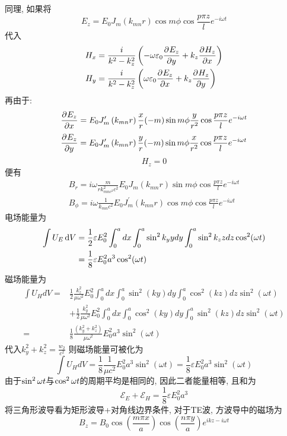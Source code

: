 \documentclass[UTF8,9pt]{ctexart}
\begin{document}
同理, 如果将$$ 
E_z=E_{0} J_{m}\left(k_{m n} r\right) \cos m \phi \cos \frac{p \pi z}{l} e^{-i \omega t}
 $$
代入
$$\begin{aligned} 
    H_x &= \frac{i}{k^2-k_z^2}\left( -\omega \varepsilon_0\frac{\partial^{} E_z}{\partial {y}^{}}+k_z\frac{\partial^{} H_z}{\partial {x}^{}} \right)\\
    H_y &= \frac{i}{k^2-k_z^2}\left( \omega \varepsilon_0\frac{\partial^{} E_z}{\partial {x}^{}}+k_z\frac{\partial^{} H_z}{\partial {y}^{}} \right)
 \end{aligned}$$
再由于:
$$\frac{\partial^{} E_z}{\partial {x}^{}} = E_{0} J'_{m}\left(k_{m n} r\right)\frac{x}{r}(-m) \sin m \phi\frac{y}{r^2} \cos \frac{p \pi z}{l} e^{-i \omega t}$$
$$\frac{\partial^{} E_z}{\partial {y}^{}} = E_{0} J'_{m}\left(k_{m n} r\right)\frac{y}{r}(-m) \sin m \phi\frac{x}{r^2} \cos \frac{p \pi z}{l} e^{-i \omega t}$$
$$H_z=0$$
便有
$$ \boxed{
\begin{array}{l}{B_{r}=i \omega \frac{m}{r k_{m n c^{2}}^{2} c^{2}} E_{0} J_{m}\left(k_{m n} r\right) \sin m \phi \cos \frac{p \pi z}{l} e^{-i \omega t}} \\ {B_{\phi}=i \omega \frac{1}{k_{m n} c^{2}} E_{0} J_{m}^{\prime}\left(k_{m n} r\right) \cos m \phi \cos \frac{p \pi z}{l} e^{-i \omega t}}\end{array}
 }$$
电场能量为
$$ 
\begin{aligned} \int U_{E} \mathop{}\!\mathrm{d} V &=\frac{1}{2} \varepsilon E_{0}^{2} \int_{0}^{a} d x \int_{0}^{a} \sin ^{2} k_{y} y d y \int_{0}^{a} \sin ^{2} k_{z} z d z \cos ^{2}(\omega t) \\ &=\frac{1}{8} \varepsilon E_{0}^{2} a^{3} \cos ^{2}(\omega t) \end{aligned}
 $$
 磁场能量为
 $$ 
\begin{aligned} \int U_{H} d V=& \frac{1}{2} \frac{k_{z}^{2}}{\mu \omega^{2}} E_{0}^{2} \int_{0}^{a} d x \int_{0}^{a} \sin ^{2}(k y) d y \int_{0}^{a} \cos ^{2}(k z) d z \sin ^{2}(\omega t) \\ &+\frac{1}{2} \frac{k_{y}^{2}}{\mu \omega^{2}} E_{0}^{2} \int_{0}^{a} d x \int_{0}^{a} \cos ^{2}(k y) d y \int_{0}^{a} \sin ^{2}(k z) d z \sin ^{2}(\omega t) \\=& \frac{1}{8} \frac{\left(k_{y}^{2}+k_{z}^{2}\right)}{\mu \omega^{2}} E_{0}^{2} a^{3} \sin ^{2}(\omega t) \end{aligned}
 $$
 代入$k_{y}^{2}+k_{z}^{2}=\frac{w_{2}}{c^{2}}$
 则磁场能量可被化为
 $$ 
\int U_{H} d V=\frac{1}{8} \frac{1}{\mu c^{2}} E_{0}^{2} a^{3} \sin ^{2}(\omega t)=\frac{1}{8} \varepsilon E_{0}^{2} a^{3} \sin ^{2}(\omega t)
 $$
由于$\sin^2\omega t$与$\cos^2\omega t$的周期平均是相同的, 因此二者能量相等, 且和为
$$ 
\mathcal{E}_{E}+\mathcal{E}_{H}=\frac{1}{8} \varepsilon E_{0}^{2} a^{3}
 $$
 将三角形波导看为矩形波导+对角线边界条件, 对于TE波, 方波导中的磁场为
 $$ 
B_{z}=B_{0} \cos \left(\frac{m \pi x}{a}\right) \cos \left(\frac{n \pi y}{a}\right) e^{i k z-i \omega t}
 $$
\end{document}
